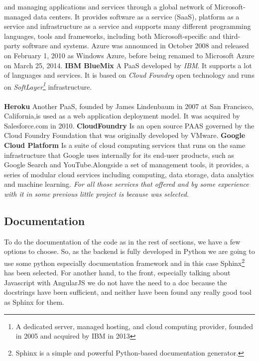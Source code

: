 and managing applications and services through a global network of Microsoft-managed
data centers. It provides software as a service (SaaS), platform as a service and
infrastructure as a service and supports many different programming languages,
tools and frameworks, including both Microsoft-specific and third-party software and systems.
Azure was announced in October 2008 and released on February 1, 2010 as Windows
 Azure, before being renamed to Microsoft Azure on March 25, 2014.
\intro
\textbf{IBM BlueMix}
\intro
A PaaS developed by \textit{IBM}. It supports a lot of languages and services. It is
based on \textit{Cloud Foundry} open technology and runs on
\textit{SoftLayer\footnote{A dedicated server, managed hosting, and cloud
computing provider, founded in 2005 and acquired by IBM in 2013}} infrastructure.
\\\\
\intro
\textbf{Heroku}
\intro
Another PaaS, founded by James Lindenbaum in 2007 at
San Francisco, California,is used as a web application deployment model.
It was acquired by Salesforce.com in 2010.
\intro
\textbf{CloudFoundry}
\intro Is an open source PAAS governed by the Cloud Foundry Foundation that
was originally developed by VMware.
\intro
\textbf{Google Cloud Platform}
\intro Is a suite of cloud computing services
that runs on the same infrastructure that Google uses internally for its end-user
products, such as Google Search and YouTube.Alongside a set of management tools,
it provides, a series of modular cloud services including computing, data storage,
data analytics and machine learning.
\intro
\textit{For all those services that offered and by some experience with it in
some previous little project is because was selected.}

\subsection{Documentation}

To do the documentation of the code as in the rest of sections, we have a few options
to choose. So, as the backend is fully developed in Python we are going to use some python
especially documentation framework and in this case Sphinx\footnote{Sphinx is a
simple and powerful Python-based documentation generator.} has been selected.
\intro
For another hand, to the front, especially talking about Javascript with AngularJS
we do not have the need to a doc because the docstrings have been sufficient,
and neither have been found any really good tool as Sphinx for them. \pagebreak

